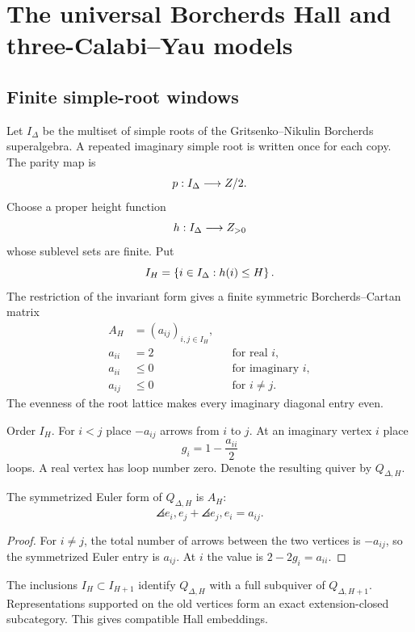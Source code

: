 \part{The universal Borcherds Hall and three-Calabi--Yau models}

\chapter{Finite simple-root windows}
Let $I_\Delta$ be the multiset of simple roots of the Gritsenko--Nikulin Borcherds superalgebra.  A repeated imaginary simple root is written once for each copy.  The parity map is
\[
 p:I_\Delta\longrightarrow Z/2.
\]
Choose a proper height function
\[
 h:I_\Delta\longrightarrow Z_{>0}
\]
whose sublevel sets are finite.  Put
\[
 I_H=\left\{i\in I_\Delta:h(i)\le H\right\}.
\]
The restriction of the invariant form gives a finite symmetric Borcherds--Cartan matrix
\[
\begin{aligned}
 A_H&=(a_{ij})_{i,j\in I_H},\\
 a_{ii}&=2 &&\text{for real }i,\\
 a_{ii}&\leq0 &&\text{for imaginary }i,\\
 a_{ij}&\leq0 &&\text{for }i\neq j.
\end{aligned}
\]
The evenness of the root lattice makes every imaginary diagonal entry even.

\begin{construction}
Order $I_H$.  For $i<j$ place $-a_{ij}$ arrows from $i$ to $j$.  At an imaginary vertex $i$ place
\[
 g_i=1-\frac{a_{ii}}2
\]
loops.  A real vertex has loop number zero.  Denote the resulting quiver by $Q_{\Delta,H}$.
\end{construction}

\begin{proposition}
The symmetrized Euler form of $Q_{\Delta,H}$ is $A_H$:
\[
 \angles{e_i,e_j}+\angles{e_j,e_i}=a_{ij}.
\]
\end{proposition}
\begin{proof}
For $i\ne j$, the total number of arrows between the two vertices is $-a_{ij}$, so the symmetrized Euler entry is $a_{ij}$.  At $i$ the value is $2-2g_i=a_{ii}$.
\end{proof}

The inclusions $I_H\subset I_{H+1}$ identify $Q_{\Delta,H}$ with a full subquiver of $Q_{\Delta,H+1}$.  Representations supported on the old vertices form an exact extension-closed subcategory.  This gives compatible Hall embeddings.


